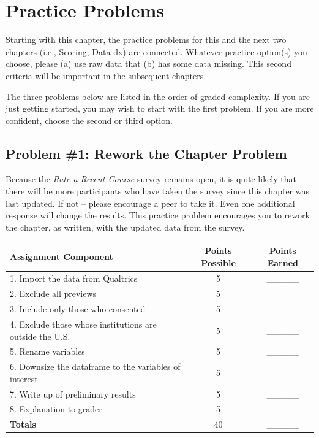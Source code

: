\documentclass[
  english,
]{book}
\begin{document}
\hypertarget{practice-problems}{%
\section{Practice Problems}\label{practice-problems}}

Starting with this chapter, the practice problems for this and the next two chapters (i.e., Scoring, Data dx) are connected. Whatever practice option(s) you choose, please (a) use raw data that (b) has some data missing. This second criteria will be important in the subsequent chapters.

The three problems below are listed in the order of graded complexity. If you are just getting started, you may wish to start with the first problem. If you are more confident, choose the second or third option.

\hypertarget{problem-1-rework-the-chapter-problem}{%
\subsection{Problem \#1: Rework the Chapter Problem}\label{problem-1-rework-the-chapter-problem}}

Because the \emph{Rate-a-Recent-Course} survey remains open, it is quite likely that there will be more participants who have taken the survey since this chapter was last updated. If not -- please encourage a peer to take it. Even one additional response will change the results. This practice problem encourages you to rework the chapter, as written, with the updated data from the survey.

\begin{longtable}[]{@{}lcc@{}}
\toprule
Assignment Component & Points Possible & Points Earned \\
\midrule
\endhead
1. Import the data from Qualtrics & 5 & \_\_\_\_\_ \\
2. Exclude all previews & 5 & \_\_\_\_\_ \\
3. Include only those who consented & 5 & \_\_\_\_\_ \\
4. Exclude those whose institutions are outside the U.S. & 5 & \_\_\_\_\_ \\
5. Rename variables & 5 & \_\_\_\_\_ \\
6. Downsize the dataframe to the variables of interest & 5 & \_\_\_\_\_ \\
7. Write up of preliminary results & 5 & \_\_\_\_\_ \\
8. Explanation to grader & 5 & \_\_\_\_\_ \\
\textbf{Totals} & 40 & \_\_\_\_\_ \\
\bottomrule
\end{longtable}
\end{document}
